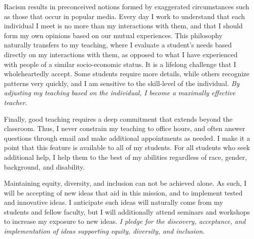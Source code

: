 \documentclass[a4paper,11pt]{article}
\begin{document}
Racism results in preconceived notions formed by exaggerated circumstances such as those that occur in popular media. Every day I work to understand that each individual I meet is no more than my interactions with them, and that I should form my own opinions based on our mutual experiences. This philosophy naturally transfers to my teaching, where I evaluate a student's needs based directly on my interactions with them, as opposed to what I have experienced with people of a similar socio-economic status. It is a lifelong challenge that I wholeheartedly accept. Some students require more details, while others recognize patterns very quickly, and I am sensitive to the skill-level of the individual. \textit{By adjusting my teaching based on the individual, I become a maximally effective teacher}.

Finally, good teaching requires a deep commitment that extends beyond the classroom. Thus, I never constrain my teaching to office hours, and often answer questions through email and make additional appointments as needed. I make it a point that this feature is available to all of my students. For all students who seek additional help, I help them to the best of my abilities regardless of race, gender, background, and disability.

Maintaining equity, diversity, and inclusion can not be achieved alone. As such, I will be accepting of new ideas that aid in this mission, and to implement tested and innovative ideas. I anticipate such ideas will naturally come from my students and fellow faculty, but I will additionally attend seminars and workshops to increase my exposure to new ideas. \textit{I pledge for the discovery, acceptance, and implementation of ideas supporting equity, diversity, and inclusion}.
\end{document}
